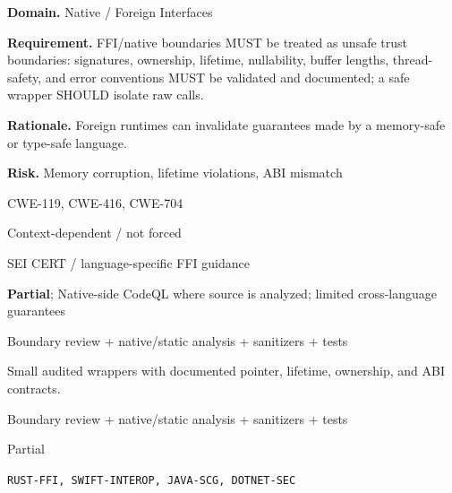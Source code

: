 \documentclass[10pt,letterpaper]{article}
\newcommand{\prioritybadge}[2]{\tcbox[on line,boxrule=0pt,arc=1.2mm,boxsep=0.7mm,left=1mm,right=1mm,top=0.4mm,bottom=0.4mm,colback=#2!12,coltext=#2]{\scriptsize\bfseries #1}}
\begin{document}
\begin{rulebox}[title={\texttt{SCS-ALL-FFI-001} \hfill \prioritybadge{Critical Control}{Critical}}]
\textbf{Domain.} Native / Foreign Interfaces

\textbf{Requirement.} FFI/native boundaries MUST be treated as unsafe trust boundaries: signatures, ownership, lifetime, nullability, buffer lengths, thread-safety, and error conventions MUST be validated and documented; a safe wrapper SHOULD isolate raw calls.

\textbf{Rationale.} Foreign runtimes can invalidate guarantees made by a memory-safe or type-safe language.

\textbf{Risk.} Memory corruption, lifetime violations, ABI mismatch

\begin{description}[leftmargin=2.65cm,labelwidth=2.3cm,style=nextline,itemsep=1pt,topsep=3pt]
  \item[CWE] CWE-119, CWE-416, CWE-704
  \item[OWASP] Context-dependent / not forced
  \item[CERT] SEI CERT / language-specific FFI guidance
  \item[CodeQL] \textbf{Partial}; Native-side CodeQL where source is analyzed; limited cross-language guarantees
  \item[Enforcement] Boundary review + native/static analysis + sanitizers + tests
  \item[Prevention] Small audited wrappers with documented pointer, lifetime, ownership, and ABI contracts.
  \item[Verification] Boundary review + native/static analysis + sanitizers + tests
  \item[Automation] Partial
  \item[Sources] \texttt{RUST-FFI, SWIFT-INTEROP, JAVA-SCG, DOTNET-SEC}
\end{description}
\end{rulebox}
\end{document}
